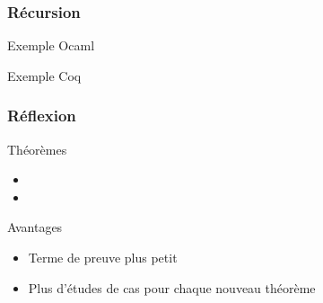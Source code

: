 \documentclass{beamer}
\newcommand{\codefrom}[3]
           {}
\newcommand{\codefromOcaml}[3]
           {}
\begin{document}
\begin{frame}
\frametitle{Récursion} 

\begin{block}{Exemple Ocaml}
  \fontsize{8}{10} \codefromOcaml{rapport}{example}{nbit}
\end{block}


\begin{block}{Exemple Coq}
  \fontsize{8}{10} \codefrom{src}{binary}{nbit}
\end{block}


\end{frame}


\begin{frame}
\frametitle{Réflexion} 

\begin{block}{Théorèmes}
  \begin{itemize}
  \item \fontsize{8}{10} \codefrom{src}{association_list}{lookup_lookdown}
  \item \fontsize{8}{10} \codefrom{src}{association_list}{lookdown_lookup}
  \end{itemize}    
\end{block}


\begin{block}{Avantages}
  \begin{itemize}
  \item Terme de preuve plus petit
  \item Plus d'études de cas pour chaque nouveau théorème
  \end{itemize}    
\end{block}

\end{frame}
\end{document}
